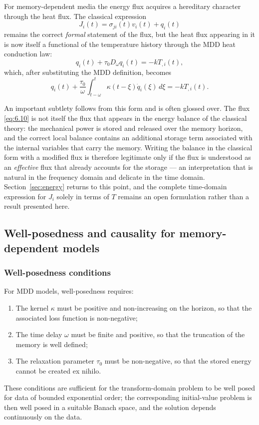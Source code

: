 For memory-dependent media the energy flux acquires a hereditary character through the heat flux. The classical expression
\begin{equation}
J_i(t) = \sigma_{ji}(t)v_i(t) + q_i(t)
\label{eq:6.10}
\end{equation}
remains the correct \emph{formal} statement of the flux, but the heat flux appearing in it is now itself a functional of the temperature history through the MDD heat conduction law:
\begin{equation}
q_i(t) + \tau_0 D_\omega q_i(t) = -k T_{,i}(t),
\label{eq:6.11}
\end{equation}
which, after substituting the MDD definition, becomes
\begin{equation}
q_i(t) + \frac{\tau_0}{\omega}\int_{t-\omega}^{t} \kappa(t-\xi) \dot{q}_i(\xi)\,d\xi = -k T_{,i}(t).
\label{eq:6.12}
\end{equation}

An important subtlety follows from this form and is often glossed over. The flux \eqref{eq:6.10} is not itself the flux that appears in the energy balance of the classical theory: the mechanical power is stored and released over the memory horizon, and the correct local balance contains an additional storage term associated with the internal variables that carry the memory. Writing the balance in the classical form with a modified flux is therefore legitimate only if the flux is understood as an \emph{effective} flux that already accounts for the storage --- an interpretation that is natural in the frequency domain and delicate in the time domain. Section~\ref{sec:energy} returns to this point, and the complete time-domain expression for $J_i$ solely in terms of $T$ remains an open formulation rather than a result presented here.

\subsection{Well-posedness and causality for memory-dependent models}
\label{sec:6.6}

\subsubsection{Well-posedness conditions}

For MDD models, well-posedness requires:
\begin{enumerate}
\item The kernel $\kappa$ must be positive and non-increasing on the horizon, so that the associated loss function is non-negative;
\item The time delay $\omega$ must be finite and positive, so that the truncation of the memory is well defined;
\item The relaxation parameter $\tau_0$ must be non-negative, so that the stored energy cannot be created ex nihilo.
\end{enumerate}
These conditions are sufficient for the transform-domain problem to be well posed for data of bounded exponential order; the corresponding initial-value problem is then well posed in a suitable Banach space, and the solution depends continuously on the data.

